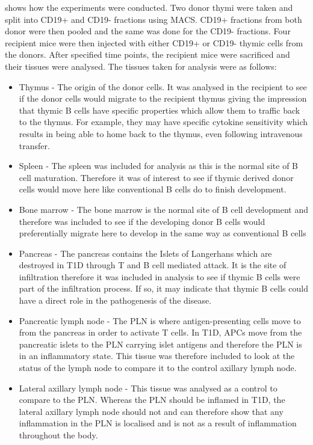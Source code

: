  shows how the experiments were conducted. 
Two donor thymi were taken and split into CD19+ and CD19- fractions using MACS.
CD19+ fractions from both donor were then pooled and the same was done for the CD19- fractions.
Four recipient mice were then injected with either CD19+ or CD19- thymic cells from the donors.
After specified time points, the recipient mice were sacrificed and their tissues were analysed.
The tissues taken for analysis were as follows:
\begin{itemize}
\item Thymus - The origin of the donor cells. It was analysed in the recipient to see if the donor cells would migrate to the recipient thymus giving the impression that thymic B cells have specific properties which allow them to traffic back to the thymus.
For example, they may have specific cytokine sensitivity which results in being able to home back to the thymus, even following intravenous transfer.
\item Spleen - The spleen was included for analysis as this is the normal site of B cell maturation.
Therefore it was of interest to see if thymic derived donor cells would move here like conventional B cells do to finish development.
\item Bone marrow - The bone marrow is the normal site of B cell development and therefore was included to see if the developing donor B cells would preferentially migrate here to develop in the same way as conventional B cells
\item Pancreas - The pancreas contains the Islets of Langerhans which are destroyed in T1D through T and B cell mediated attack.
It is the site of infiltration therefore it was included in analysis to see if thymic B cells were part of the infiltration process.
If so, it may indicate that thymic B cells could have a direct role in the pathogenesis of the disease.
\item Pancreatic lymph node - The PLN is where antigen-presenting cells move to from the pancreas in order to activate T cells.
In T1D, APCs move from the pancreatic islets to the PLN carrying islet antigens and therefore the PLN is in an inflammatory state.
This tissue was therefore included to look at the status of the lymph node to compare it to the control axillary lymph node.
\item Lateral axillary lymph node - This tissue was analysed as a control to compare to the PLN.
Whereas the PLN should be inflamed in T1D, the lateral axillary lymph node should not and can therefore show that any inflammation in the PLN is localised and is not as a result of inflammation throughout the body.
\end{itemize}

